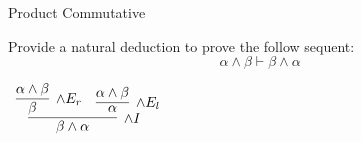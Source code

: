 \documentclass{book}
\begin{document}
        \begin{eg}{Product Commutative}

            Provide a natural deduction to prove the follow sequent: $$ \alpha \land \beta \vdash \beta \land \alpha $$
    
            \begin{center}
                $\begin{array}{c}
                    \infer[\land I]{\beta \land \alpha}
                        {\infer[\land E_{r}]{\beta}
                            {\alpha \land \beta}
                        &
                        \infer[\land E_{l}]{\alpha}
                            {\alpha \land \beta}}
                \end{array}$
            \end{center}
            
        \end{eg}
    
\end{document}
